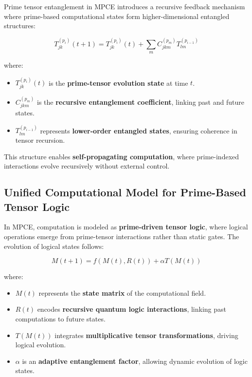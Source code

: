 \documentclass{article}
\theoremstyle{plain}
\theoremstyle{plain}
\theoremstyle{definition}
\theoremstyle{remark}
\begin{document}
Prime tensor entanglement in MPCE introduces a recursive feedback mechanism where prime-based computational states form higher-dimensional entangled structures:

\begin{equation}
T_{jk}^{(p_i)}(t+1) = T_{jk}^{(p_i)}(t) + \sum_{m} C_{jkm}^{(p_m)} T_{lm}^{(p_{i-1})}
\end{equation}

where:
\begin{itemize}
    \item $T_{jk}^{(p_i)}(t)$ is the \textbf{prime-tensor evolution state} at time $t$.
    \item $C_{jkm}^{(p_m)}$ is the \textbf{recursive entanglement coefficient}, linking past and future states.
    \item $T_{lm}^{(p_{i-1})}$ represents \textbf{lower-order entangled states}, ensuring coherence in tensor recursion.
\end{itemize}

This structure enables \textbf{self-propagating computation}, where prime-indexed interactions evolve recursively without external control.

\subsection{Unified Computational Model for Prime-Based Tensor Logic}

In MPCE, computation is modeled as \textbf{prime-driven tensor logic}, where logical operations emerge from prime-tensor interactions rather than static gates. The evolution of logical states follows:

\begin{equation}
M(t+1) = f(M(t), R(t)) + \alpha T(M(t))
\end{equation}

where:
\begin{itemize}
    \item $M(t)$ represents the \textbf{state matrix} of the computational field.
    \item $R(t)$ encodes \textbf{recursive quantum logic interactions}, linking past computations to future states.
    \item $T(M(t))$ integrates \textbf{multiplicative tensor transformations}, driving logical evolution.
    \item $\alpha$ is an \textbf{adaptive entanglement factor}, allowing dynamic evolution of logic states.
\end{itemize}
\end{document}
